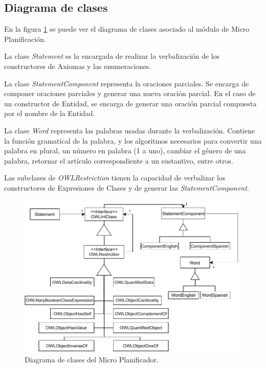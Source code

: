 \subsection{Diagrama de clases}
En la figura \ref{fig:diagrama_clases_microplanificador} se puede ver el diagrama de clases asociado al módulo de Micro Planificación. 

La clase \emph{Statement} es la encargada de realizar la verbalización de los constructores de Axiomas y las enumeraciones.

La clase \emph{StatementComponent} representa la oraciones parciales. Se encarga de componer oraciones parciales y generar una nueva oración parcial. En el caso de un constructor de Entidad, se encarga de generar una oración parcial compuesta por el nombre de la Entidad.

La clase \emph{Word} representa las palabras usadas durante la verbalización. Contiene la función gramatical de la palabra, y los algoritmos necesarios para convertir una palabra en plural, un número en palabra (1 a uno), cambiar el género de una palabra, retornar el artículo correspondiente a un sustantivo, entre otros.

Las subclases de \emph{OWLRestriction} tienen la capacidad de verbalizar los constructores de Expresiones de Clases y de generar las \emph{StatementComponent}.

\begin{figure}[H]
    \centering
    \includegraphics{img/generacion_documento/diagrama_clases_microplanificador.pdf}
    \caption{Diagrama de clases del Micro Planificador.}
    \label{fig:diagrama_clases_microplanificador}
\end{figure}


